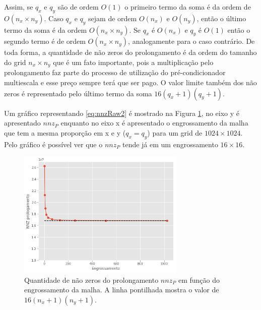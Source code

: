 Assim, se $q_x$ e $q_y$ são de ordem $O(1)$ o primeiro termo da soma é da ordem de $O(n_x \times n_y)$. Caso $q_x$ e $q_y$ sejam de ordem $O(n_x)$ e $O(n_y)$, então o último termo da soma é da ordem $O(n_x \times n_y )$. 
Se $q_x$ é $O(n_x)$ e $q_y$ é $O(1)$ então o segundo termo é de ordem $O(n_x \times n_y)$, analogamente para o caso contrário.
De toda forma, a quantidade de não zeros do prolongamento é da ordem do tamanho do grid $n_x \times n_y$ que é um fato importante, pois a multiplicação pelo prolongamento faz parte do processo de utilização do pré-condicionador multiescala e esse preço sempre terá que ser pago. O valor limite também dos não zeros é representado pelo último termo da soma $16(q_x+1)(q_y+1)$.

Um gráfico representando    \eqref{eq:nnzRaw2} é mostrado na Figura \ref{fig:nnzGrafico}, no eixo y é apresentado $nnz_P$ enquanto no eixo x é apresentado o engrossamento da malha que tem a mesma proporção em x e y ($q_x  = q_y$) para um grid de $1024 \times 1024$. Pelo gráfico é possível ver que o $nnz_P$ tende já em um engrossamento $16 \times 16$.


\begin{figure}[!htbp]
\centering
\includegraphics[width=8cm]{chap06/figs/nnzProlongamento.png}
\caption{Quantidade de não zeros do prolongamento $nnz_P$  em função do engrossamento da malha. A linha pontilhada mostra o valor de $16(n_x+1)(n_y+1)$.}
\label{fig:nnzGrafico}
\end{figure}
